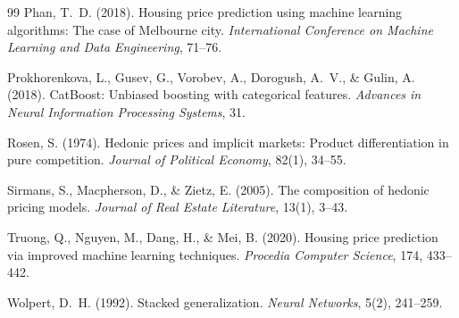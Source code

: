 \documentclass[11pt, a4paper, twoside]{article}
\begin{document}
\begin{thebibliography}{99}
Phan, T.~D. (2018).
Housing price prediction using machine learning algorithms: The case of
Melbourne city.
\textit{International Conference on Machine Learning and Data Engineering},
71--76.

Prokhorenkova, L., Gusev, G., Vorobev, A., Dorogush, A.~V., \& Gulin, A.
(2018). CatBoost: Unbiased boosting with categorical features.
\textit{Advances in Neural Information Processing Systems}, 31.

Rosen, S. (1974).
Hedonic prices and implicit markets: Product differentiation in pure
competition. \textit{Journal of Political Economy}, 82(1), 34--55.

Sirmans, S., Macpherson, D., \& Zietz, E. (2005).
The composition of hedonic pricing models.
\textit{Journal of Real Estate Literature}, 13(1), 3--43.

Truong, Q., Nguyen, M., Dang, H., \& Mei, B. (2020).
Housing price prediction via improved machine learning techniques.
\textit{Procedia Computer Science}, 174, 433--442.

Wolpert, D.~H. (1992).
Stacked generalization.
\textit{Neural Networks}, 5(2), 241--259.

\end{thebibliography}

\appendix
\end{document}
